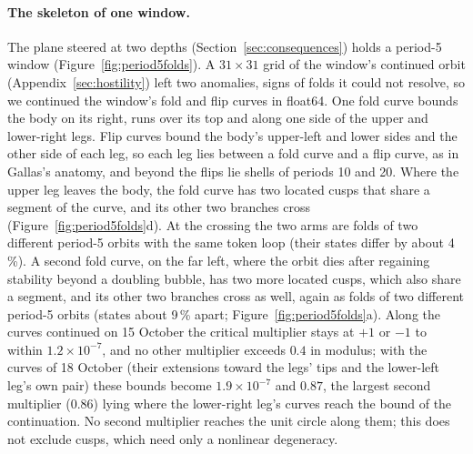 \documentclass[11pt,letterpaper]{article}
\begin{document}
\paragraph{The skeleton of one window.} The plane steered at two depths (Section~\ref{sec:consequences}) holds a
period-5 window (Figure~\ref{fig:period5folds}). A $31\times31$ grid of the window's continued orbit
(Appendix~\ref{sec:hostility}) left two anomalies, signs of folds it could not resolve, so we continued the window's
fold and flip curves in float64. One fold curve bounds the body on its right, runs over its top and along one side of
the upper and lower-right legs. Flip curves bound the body's upper-left and lower sides and the other side of each leg, so each leg lies
between a fold curve and a flip curve, as in Gallas's anatomy, and beyond the flips lie shells of periods 10 and 20.
Where the upper leg leaves the body, the fold curve has two located cusps that share a segment of the curve, and its
other two branches cross (Figure~\ref{fig:period5folds}d). At the crossing the two arms are folds of two different
period-5 orbits with the same token loop (their states differ by about 4\,\%). A second fold curve, on the far left,
where the orbit dies after regaining stability beyond a doubling bubble, has two more located cusps, which also share
a segment, and its other two branches cross as well, again as folds of two different period-5 orbits (states about 9\,\%
apart; Figure~\ref{fig:period5folds}a). Along the curves continued on 15 October the critical multiplier stays at
$+1$ or $-1$ to within $1.2\times10^{-7}$, and no other multiplier exceeds $0.4$ in modulus; with the curves of 18
October (their extensions toward the legs' tips and the lower-left leg's own pair) these bounds become
$1.9\times10^{-7}$ and $0.87$, the largest second multiplier ($0.86$) lying where the lower-right leg's curves reach
the bound of the continuation. No second multiplier reaches the unit circle along them; this does not exclude cusps,
which need only a nonlinear degeneracy.
\end{document}
